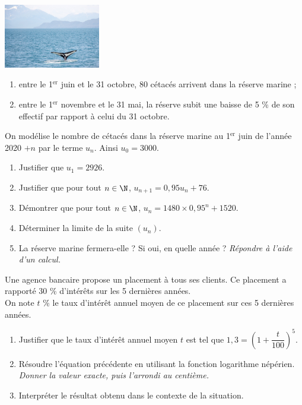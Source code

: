 \documentclass[a4paper,11pt,exos]{nsi} %
\begin{document}
\exo{}
{\includegraphics[width=4.2cm]{whale-4424846_1280.jpg}}
\begin{enumerate}[label=\textbullet]
    \item entre le 1$^{\text{er}}$ juin et le 31 octobre, 80 cétacés arrivent dans la réserve marine ;
    \item entre le 1$^{\text{er}}$ novembre et le 31 mai, la réserve subit une baisse de 5 \% de son effectif par rapport à celui du 31 octobre.
\end{enumerate}
On modélise le nombre de cétacés dans la réserve marine au 1$^{\text{er}}$ juin de l'année 2020 $+n$ par le terme $u_n$. Ainsi $u_0=3000$.
\begin{enumerate}
    \item Justifier que $u_1=2926$.
    \item Justifier que pour tout $n\in\N$, $u_{n+1}=0,95u_n+76$.
    \item Démontrer que pour tout $n\in\N$, $u_{n}=1480\times 0,95^n+1520$.
    \item Déterminer la limite de la suite $(u_n)$.
    \item La réserve marine fermera-elle ? Si oui, en quelle année ? \textit{Répondre à l'aide d'un calcul.}
\end{enumerate}
\newpage

\exo{}
Une agence bancaire propose un placement à tous ses clients. Ce placement a rapporté 30 \% d'intérêts sur les 5 dernières années.\\
On note $t$ \% le taux d'intérêt annuel moyen de ce placement sur ces 5 dernières années.
\begin{enumerate}
    \item Justifier que le taux d'intérêt annuel moyen $t$ est tel que $1,3=\left(1+\dfrac{t}{100}\right)^5$.
    \item Résoudre l'équation précédente en utilisant la fonction logarithme népérien. \textit{Donner la valeur exacte, puis l'arrondi au centième.}
    \item Interpréter le résultat obtenu dans le contexte de la situation.
\end{enumerate}
\end{document}
